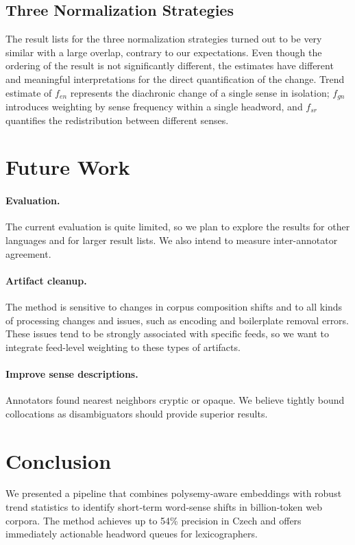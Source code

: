 \documentclass[11pt]{article}
\begin{document}
\subsection{Three Normalization Strategies}
The result lists for the three normalization strategies turned out to be very similar with a large overlap, contrary to our expectations. Even though the ordering of the result is not significantly different, the estimates have different and meaningful interpretations for the direct quantification of the change. Trend estimate of $f_{en}$ represents the diachronic change of a single sense in isolation; $f_{gn}$ introduces weighting by sense frequency within a single headword, and $f_{sr}$ quantifies the redistribution between different senses.

\section{Future Work}
\paragraph{Evaluation.} The current evaluation is quite limited, so we plan to explore the results for other languages and for larger result lists. We also intend to measure inter-annotator agreement.

\paragraph{Artifact cleanup.} The method is sensitive to changes in corpus composition shifts and to all kinds of processing changes and issues, such as encoding and boilerplate removal errors. These issues tend to be strongly associated with specific feeds, so we want to integrate feed-level weighting to these types of artifacts.

\paragraph{Improve sense descriptions.} Annotators found nearest neighbors cryptic or opaque. We believe tightly bound collocations as disambiguators should provide superior results.

\section{Conclusion}
We presented a pipeline that
combines polysemy‑aware embeddings with robust trend statistics
to identify short‑term word‑sense shifts in billion‑token web corpora.
The method achieves up to 54\% precision in Czech
and offers immediately actionable headword queues for lexicographers.
\end{document}
